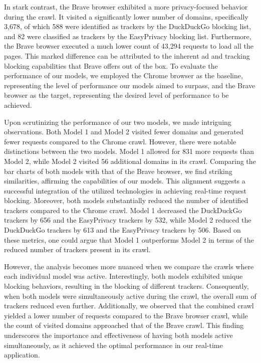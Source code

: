 In stark contrast, the Brave browser exhibited a more privacy-focused behavior during the crawl. It visited a significantly
lower number of domains, specifically 3,678, of which 588 were identified as trackers by the DuckDuckGo blocking list, and 82 were
classified as trackers by the EasyPrivacy blocking list. Furthermore, the Brave browser executed a much lower count of 43,294
requests to load all the pages. This marked difference can be attributed to the inherent ad and tracking blocking capabilities 
that Brave offers out of the box. To evaluate the performance of our models, we employed the Chrome browser as the baseline,
representing the level of performance our models aimed to surpass, and the Brave browser as the target, representing the desired
level of performance to be achieved.

Upon scrutinizing the performance of our two models, we made intriguing observations. Both Model 1 and Model 2 visited fewer
domains and generated fewer requests compared to the Chrome crawl. However, there were notable distinctions between the two models.
Model 1 allowed for 831 more requests than Model 2, while Model 2 visited 56 additional domains in its crawl. Comparing the bar charts
of both models with that of the Brave browser, we find striking similarities, affirming the capabilities of our models. This alignment
suggests a successful integration of the utilized technologies in achieving real-time request blocking. Moreover, both models
substantially reduced the number of identified trackers compared to the Chrome crawl. Model 1 decreased the DuckDuckGo trackers
by 656 and the EasyPrivacy trackers by 532, while Model 2 reduced the DuckDuckGo trackers by 613 and the EasyPrivacy trackers
by 506. Based on these metrics, one could argue that Model 1 outperforms Model 2 in terms of the reduced number of trackers
present in its crawl.

However, the analysis becomes more nuanced when we compare the crawls where each individual model was active. Interestingly,
both models exhibited unique blocking behaviors, resulting in the blocking of different trackers. Consequently, when both models
were simultaneously active during the crawl, the overall sum of trackers reduced even further. Additionally, we observed that the
combined crawl yielded a lower number of requests compared to the Brave browser crawl, while the count of visited domains
approached that of the Brave crawl. This finding underscores the importance and effectiveness of having both models active
simultaneously, as it achieved the optimal performance in our real-time application.

